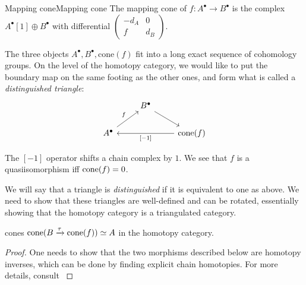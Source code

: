\begin{definition}{Mapping cone}{Mapping cone}
    The mapping cone of $f:A^\bullet\to B^\bullet$ is the complex $A^\bullet[1]\oplus B^\bullet$ with differential $\begin{pmatrix} -d_A & 0 \\ f & d_B \end{pmatrix}$.
\end{definition}

The three objects $A^\bullet, B^\bullet, \mathrm{cone}(f)$ fit into a long exact sequence of cohomology groups. On the level of the homotopy category, we would like to put the boundary map on the same footing as the other ones, and form what is called a \emph{distinguished triangle}: \[\begin{tikzcd}
    & B^\bullet \arrow[rd] &                                       \\
A^\bullet \arrow[ru, "f"] &                      & \mathrm{cone}(f) \arrow[ll, "{[-1]}"]
\end{tikzcd}\]

The $[-1]$ operator shifts a chain complex by $1$. We see that $f$ is a quasiisomorphism iff $\operatorname{cone}(f)=0$.

We will say that a triangle is \emph{distinguished} if it is equivalent to one as above. We need to show that these triangles are well-defined and can be rotated, essentially showing that the homotopy category is a triangulated category.

\begin{proposition}{}{cones}
    $\operatorname{cone}(B\xrightarrow\tau\operatorname{cone}(f))\simeq A$ in the homotopy category.
\end{proposition}

\begin{proof}
    One needs to show that the two morphisms described below are homotopy inverses, which can be done by finding explicit chain homotopies. For more details, consult \cite[\S4]{gelfand_methods_2003}
\end{proof}


